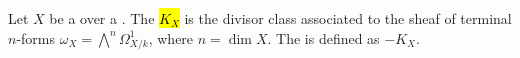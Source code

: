 \begin{definition} \label{definition:canonical_class_anti_canonical_class_of_a_variety_over_a_field}
Let $X$ be a  over a . 
The  \hl{$K_X$} is the divisor class associated to the sheaf of terminal $n$-forms $\omega_X = \bigwedge^n \Omega_{X/k}^1$, where $n = \dim X$. The  is defined as $-K_X$.
\end{definition}
